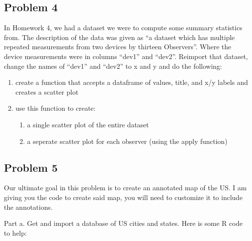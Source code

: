 \documentclass[]{article}
\begin{document}
\hypertarget{problem-4}{%
\subsection{Problem 4}\label{problem-4}}

In Homework 4, we had a dataset we were to compute some summary
statistics from. The description of the data was given as ``a dataset
which has multiple repeated measurements from two devices by thirteen
Observers''. Where the device measurements were in columns ``dev1'' and
``dev2''. Reimport that dataset, change the names of ``dev1'' and
``dev2'' to x and y and do the following:

\begin{enumerate}
  \item create a function that accepts a dataframe of values, title, and x/y labels and creates a scatter plot
  \item use this function to create:
  \begin{enumerate}
    \item a single scatter plot of the entire dataset
    \item a seperate scatter plot for each observer (using the apply function)
  \end{enumerate}
\end{enumerate}

\hypertarget{problem-5}{%
\subsection{Problem 5}\label{problem-5}}

Our ultimate goal in this problem is to create an annotated map of the
US. I am giving you the code to create said map, you will need to
customize it to include the annotations.

Part a. Get and import a database of US cities and states. Here is some
R code to help:
\end{document}
